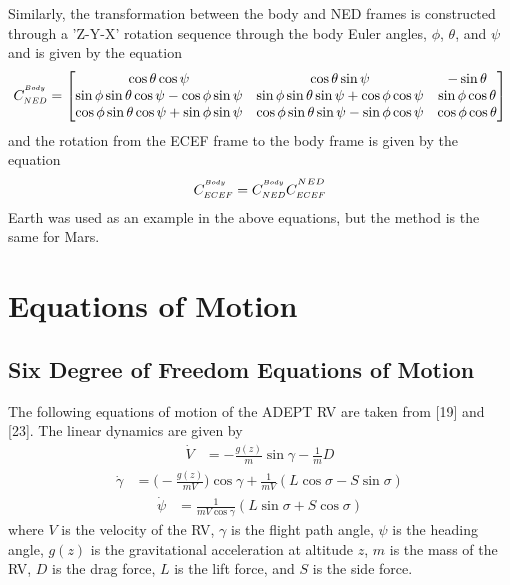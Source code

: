 \documentclass[12pt]{article}
\numberwithin{equation}{section}
\numberwithin{figure}{section}
\numberwithin{table}{section}
\begin{document}
Similarly, the transformation between the body and NED frames is constructed through a 'Z-Y-X' rotation sequence through the body Euler angles, $\phi$, $\theta$, and $\psi$ and is given by the equation
\begin{align}
  C^{^{\scaleto{Body}{4pt}}}_{\scaleto{NED}{4pt}} = \begin{bmatrix}
    \cos{\theta}\cos{\psi} & \cos{\theta}\sin{\psi} & -\sin{\theta} \\
    \sin{\phi}\sin{\theta}\cos{\psi} - \cos{\phi}\sin{\psi} & \sin{\phi}\sin{\theta}\sin{\psi} + \cos{\phi}\cos{\psi} & \sin{\phi}\cos{\theta} \\
    \cos{\phi}\sin{\theta}\cos{\psi} + \sin{\phi}\sin{\psi} & \cos{\phi}\sin{\theta}\sin{\psi} - \sin{\phi}\cos{\psi} & \cos{\phi}\cos{\theta}
  \end{bmatrix}
\end{align}
and the rotation from the ECEF frame to the body frame is given by the equation
\begin{align}
  C^{^{\scaleto{Body}{4pt}}}_{\scaleto{ECEF}{4pt}} = C^{^{\scaleto{Body}{4pt}}}_{\scaleto{NED}{4pt}}C^{^{\scaleto{NED}{4pt}}}_{\scaleto{ECEF}{4pt}}
\end{align}
Earth was used as an example in the above equations, but the method is the same for Mars.



\section{Equations of Motion}
\subsection{Six Degree of Freedom Equations of Motion}
The following equations of motion of the ADEPT RV are taken from [19] and [23]. The linear dynamics are given by
\begin{align}
  \dot{V} &= -\frac{g(z)}{m}\sin\gamma - \frac{1}{m}D
\end{align}
\begin{align}
  \dot{\gamma} &= \biggl(-\frac{g(z)}{mV}\biggl)\cos\gamma + \frac{1}{mV}(L\cos\sigma - S\sin\sigma)
\end{align}
\begin{align}
  \dot\psi &= \frac{1}{mV\cos\gamma}(L\sin\sigma + S\cos\sigma)
\end{align}
where $V$ is the velocity of the RV, $\gamma$ is the flight path angle, $\psi$ is the heading angle, $g(z)$ is the gravitational acceleration at altitude $z$, $m$ is the mass of the RV, $D$ is the drag force, $L$ is the lift force, and $S$ is the side force.
\end{document}
